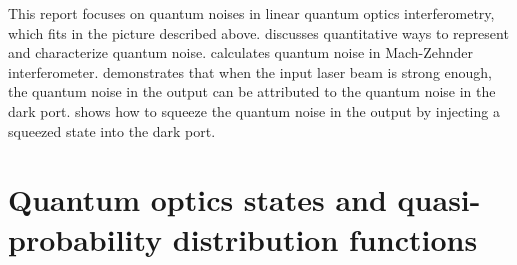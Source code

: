 \documentclass[hyperref, a4paper]{article}
\begin{document}

This report focuses on quantum noises in linear quantum optics interferometry,
which fits in the picture described above.
 discusses quantitative ways to represent and characterize quantum noise.
 calculates quantum noise 
in Mach-Zehnder interferometer.
 demonstrates that
when the input laser beam is strong enough,
the quantum noise in the output can be attributed to the quantum noise in the dark port.
 shows how to squeeze the quantum noise in the output 
by injecting a squeezed state into the dark port.

\section{Quantum optics states and quasi-probability distribution functions}\label{sec:overview-rep}
\end{document}

